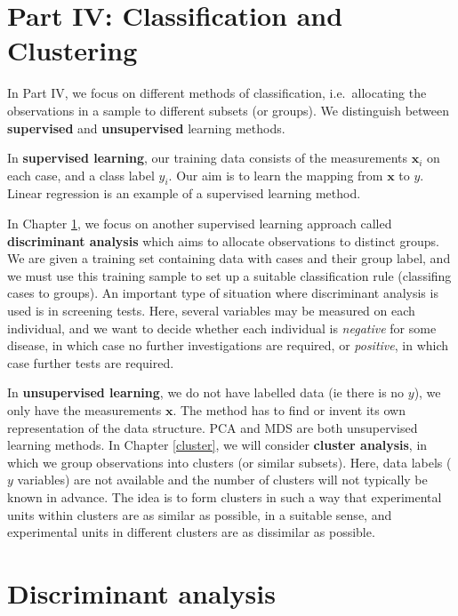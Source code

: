 \documentclass[
]{book}
\theoremstyle{definition}
\theoremstyle{definition}
\theoremstyle{definition}
\theoremstyle{definition}
\theoremstyle{remark}
\begin{document}
\chapter*{Part IV: Classification and Clustering}\label{part-iv-classification-and-clustering}

In Part IV, we focus on different methods of classification,
i.e.~allocating the observations in a sample to different subsets (or
groups). We distinguish between \textbf{supervised} and \textbf{unsupervised} learning methods.

In \textbf{supervised learning}, our training data consists of the measurements \(\mathbf x_i\) on each case, and a class label \(y_i\). Our aim is to learn the mapping from \(\mathbf x\) to \(y\). Linear regression is an example of a supervised learning method.

In Chapter \ref{lda}, we focus on another supervised learning approach called \textbf{discriminant analysis} which aims to allocate observations to distinct groups. We are given a training set containing data with cases and their group label, and we must use this training sample to set up a suitable classification rule (classifing cases to groups). An important type of situation where discriminant analysis is used is in screening tests. Here, several variables may be measured on each individual, and we want to decide whether each individual is \emph{negative} for some disease, in which case no further investigations are required, or \emph{positive}, in which case further tests are required.

In \textbf{unsupervised learning}, we do not have labelled data (ie there is no \(y\)), we only have the measurements \(\mathbf x\). The method has to find or invent its own representation of the data structure. PCA and MDS are both unsupervised learning methods. In Chapter \ref{cluster}, we will consider \textbf{cluster analysis},
in which we group observations into clusters (or similar subsets).
Here, data labels (\(y\) variables) are not available and the number of clusters will
not typically be known in advance. The idea is to form clusters in such a way that experimental units within clusters are as similar as possible, in a suitable sense,
and experimental units in different clusters are as dissimilar as possible.

\chapter{Discriminant analysis}\label{lda}
\end{document}
